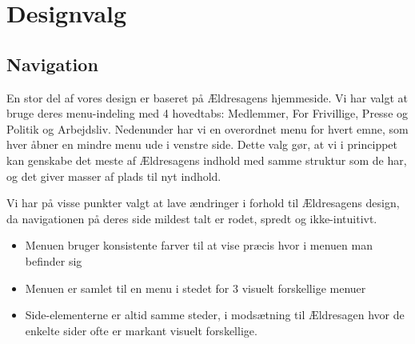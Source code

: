 \section{Designvalg}
\subsection{Navigation}
En stor del af vores design er baseret på Ældresagens hjemmeside. Vi har
valgt at bruge deres menu-indeling med 4 hovedtabs: Medlemmer, For Frivillige,
Presse og Politik og Arbejdsliv. Nedenunder har vi en overordnet menu for hvert
emne, som hver åbner en mindre menu ude i venstre side. Dette valg gør, at vi i
princippet kan genskabe det meste af Ældresagens indhold med samme struktur som de
har, og det giver masser af plads til nyt indhold. 

Vi har på visse punkter valgt at lave ændringer i forhold til Ældresagens design, da
navigationen på deres side mildest talt er rodet, spredt og ikke-intuitivt. 

\begin{itemize}
\item Menuen bruger konsistente farver til at vise præcis hvor i menuen man befinder sig
\item Menuen er samlet til en menu i stedet for 3 visuelt forskellige menuer
\item Side-elementerne er altid samme steder, i modsætning til Ældresagen hvor de enkelte sider
      ofte er markant visuelt forskellige.

\end{itemize}


